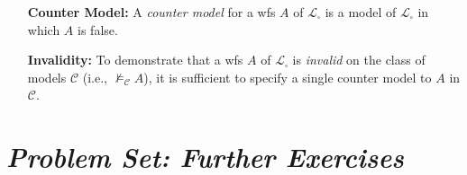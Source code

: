 \documentclass[a4paper, 11pt]{article} %
\newcommand{\set}[1]{\lbrace#1\rbrace} %
\renewcommand{\L}[0]{\mathcal{L}}
\begin{document}
\begin{enumerate}[leftmargin=1.2in,labelsep=.15in]
\begin{enumerate}
	\item[$(S4)$] The system $S4$ is sound and complete over the reflexive and transitive models $\mathcal{C}_{S4}=\mathcal{C}_r\bigcap\mathcal{C}_t$, i.e., $\vdash_{S4} A$ if and only if $\vDash_{\mathcal{C}_{S4}} A$.\footnote{The intersection $X\bigcap Y$ is the set of elements in both $X$ and $Y$, i.e., $X\bigcap Y=\set{z:z\in X ~\text{and}~ z\in Y}$.}
	\item[$(S5)$] The modal system $S5$ is sound and complete over the class of all reflexive, symmetric, and transitive models $\mathcal{C}_{S5}=\mathcal{C}_r\bigcap\mathcal{C}_s\bigcap\mathcal{C}_t$, i.e., $\vdash_{S5} A$ if and only if $\vDash_{\mathcal{C}_{S5}} A$.\footnote{See \citet{Hughes1996} for proofs of soundness and completeness for $K,T,S4$, and $S5$.}
	\end{enumerate}
\item[\bf Counter Model:] A \textit{counter model} for a wfs $A$ of $\L_\square$ is a model of $\L_\square$ in which $A$ is false.
\item[\bf Invalidity:] To demonstrate that a wfs $A$ of $\L_\square$ is \textit{invalid} on the class of models $\mathcal{C}$ (i.e., $\nvDash_\mathcal{C} A$), it is sufficient to specify a single counter model to $A$ in $\mathcal{C}$.
\end{enumerate}




\section*{\it Problem Set: Further Exercises}
\end{document}
